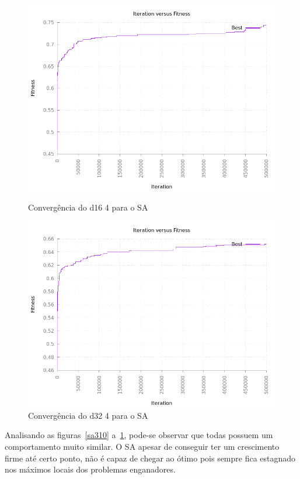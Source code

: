 \documentclass[12pt]{article}
\begin{document}
\begin{figure}[h!]
    \centering
    \begin{minipage}{0.45\textwidth}
        \centering
        \includegraphics[width=\textwidth]{pictures/sad164}
        \caption{Convergência do d16 4 para o SA}
    \end{minipage}
    \begin{minipage}{0.45\textwidth}
        \centering
        \includegraphics[width=\textwidth]{pictures/sad324}
        \caption{Convergência do d32 4 para o SA}
        \label{sa324}
    \end{minipage}
\end{figure}

Analisando as figuras~\ref{sa310} a~\ref{sa324}, pode-se observar que todas possuem um 
comportamento muito similar. O SA apesar de conseguir ter um crescimento firme até certo 
ponto, não é capaz de chegar ao ótimo pois sempre fica estagnado nos máximos locais dos 
problemas enganadores.
\end{document}
